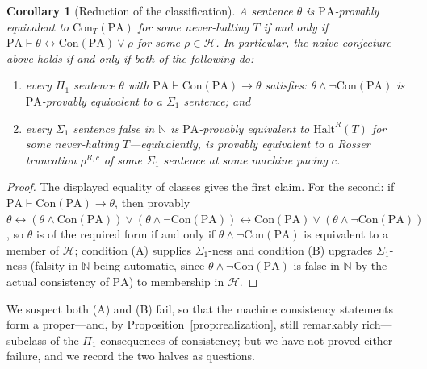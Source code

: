 \documentclass[11pt]{amsart}
\newtheorem{corollary}[theorem]{Corollary}
\theoremstyle{definition}
\theoremstyle{remark}
\newcommand{\PA}{\mathrm{PA}}
\newcommand{\Con}{\mathrm{Con}}
\newcommand{\N}{\mathbb{N}}
\begin{document}
\begin{corollary}[Reduction of the classification]\label{cor:reduction}
A sentence $\theta$ is $\PA$-provably equivalent to $\Con_T(\PA)$ for
some never-halting $T$ if and only if
$\PA\vdash\theta\leftrightarrow\Con(\PA)\vee\rho$ for some
$\rho\in\mathcal{H}$. In particular, the naive conjecture above holds if
and only if both of the following do:
\begin{enumerate}
\item[\textup{(A)}] every $\Pi_1$ sentence $\theta$ with
$\PA\vdash\Con(\PA)\to\theta$ satisfies: $\theta\wedge\neg\Con(\PA)$ is
$\PA$-provably equivalent to a $\Sigma_1$ sentence; and
\item[\textup{(B)}] every $\Sigma_1$ sentence false in $\N$ is
$\PA$-provably equivalent to $\mathrm{Halt}^R(T)$ for some never-halting
$T$---equivalently, is provably equivalent to a Rosser truncation
$\rho^{R,c}$ of some $\Sigma_1$ sentence at some machine pacing $c$.
\end{enumerate}
\end{corollary}

\begin{proof}
The displayed equality of classes gives the first claim. For the second:
if $\PA\vdash\Con(\PA)\to\theta$, then provably
$\theta\leftrightarrow(\theta\wedge\Con(\PA))\vee(\theta\wedge\neg\Con(\PA))
\leftrightarrow\Con(\PA)\vee(\theta\wedge\neg\Con(\PA))$, so $\theta$ is
of the required form if and only if $\theta\wedge\neg\Con(\PA)$ is
equivalent to a member of $\mathcal{H}$; condition (A) supplies
$\Sigma_1$-ness and condition (B) upgrades $\Sigma_1$-ness (falsity in
$\N$ being automatic, since $\theta\wedge\neg\Con(\PA)$ is false in $\N$
by the actual consistency of $\PA$) to membership in $\mathcal{H}$.
\end{proof}

We suspect both (A) and (B) fail, so that the machine consistency
statements form a proper---and, by
Proposition~\ref{prop:realization}, still remarkably rich---subclass of
the $\Pi_1$ consequences of consistency; but we have not proved either
failure, and we record the two halves as questions.
\end{document}
